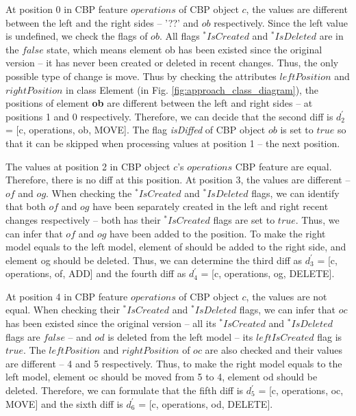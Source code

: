 \documentclass{llncs}
\begin{document}
At position 0 in CBP feature $operations$ of CBP object $c$, the values are different between the left and the right sides -- '??' and $ob$ respectively. Since the left value is undefined, we check the flags of $ob$. All flags $^*IsCreated$ and $^*IsDeleted$ are in the $false$ state, which means element \textsf{ob} has been existed since the original version -- it has never been created or deleted in recent changes. Thus, the only possible type of change is move. Thus by checking the attributes $leftPosition$ and $rightPosition$ in class \textsf{Element} (in Fig. \ref{fig:approach_class_diagram}), the positions of element \textbf{ob} are different between the left and right sides -- at positions 1 and 0 respectively. Therefore, we can decide that the second diff is $d_2^\prime$ = [\textsf{c}, \textsf{operations}, \textsf{ob}, \textsf{MOVE}]. The flag \textit{isDiffed} of CBP object $ob$ is set to $true$ so that it can be skipped when processing values at position 1 -- the next position.  

The values at position 2 in CBP object $c$'s $operations$ CBP feature are equal. Therefore, there is no diff at this position. At position 3, the values are different -- $of$ and $og$. When checking the $^*IsCreated$ and $^*IsDeleted$ flags, we can identify that both $of$ and $og$ have been separately created in the left and right recent changes respectively -- both has their $^*IsCreated$ flags are set to $true$. Thus, we can infer that $of$ and $og$ have been added to the position. To make the right model equals to the left model, element \textsf{of} should be added to the right side, and element \textsf{og} should be deleted. Thus, we can determine the third diff as $d_3^\prime$ = [\textsf{c}, \textsf{operations}, \textsf{of}, \textsf{ADD}] and the fourth diff as $d_4^\prime$ = [\textsf{c}, \textsf{operations}, \textsf{og}, \textsf{DELETE}].

At position 4 in CBP feature $operations$ of CBP object $c$, the values are not equal. When checking their $^*IsCreated$ and $^*IsDeleted$ flags, we can infer that $oc$ has been existed since the original version -- all its $^*IsCreated$ and $^*IsDeleted$ flags are $false$ -- and $od$ is deleted from the left model -- its $leftIsCreated$ flag is $true$. The $leftPosition$ and $rightPosition$ of $oc$ are also checked and their values are different -- 4 and 5 respectively. Thus, to make the right model equals to the left model, element \textsf{oc} should be moved from 5 to 4, element \textsf{od} should be deleted. Therefore, we can formulate  that the fifth diff is $d_5^\prime$ = [\textsf{c}, \textsf{operations}, \textsf{oc}, \textsf{MOVE}] and the sixth diff is $d_6^\prime$ = [\textsf{c}, \textsf{operations}, \textsf{od}, \textsf{DELETE}]. 
\end{document}
